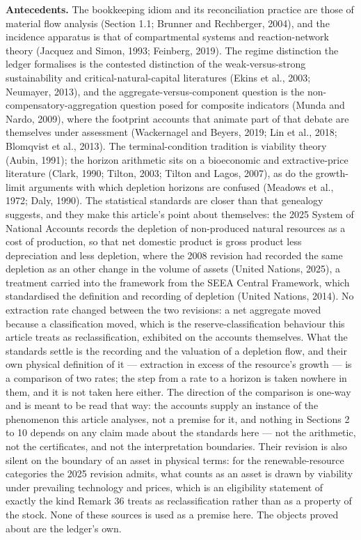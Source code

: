 \documentclass[11pt]{article}
\begin{document}
\textbf{Antecedents.} The bookkeeping idiom and its reconciliation practice are those of material flow
analysis (Section 1.1; Brunner and Rechberger, 2004), and the incidence apparatus is that of
compartmental systems and reaction-network theory (Jacquez and Simon, 1993; Feinberg, 2019). The
regime distinction the ledger formalises is the contested distinction of the weak-versus-strong
sustainability and critical-natural-capital literatures (Ekins et al., 2003; Neumayer, 2013), and
the aggregate-versus-component question is the non-compensatory-aggregation question posed for
composite indicators (Munda and Nardo, 2009), where the footprint accounts that animate part of that
debate are themselves under assessment (Wackernagel and Beyers, 2019; Lin et al., 2018; Blomqvist
et al., 2013). The terminal-condition tradition is viability theory (Aubin, 1991); the horizon
arithmetic sits on a bioeconomic and extractive-price literature (Clark, 1990; Tilton, 2003; Tilton
and Lagos, 2007), as do the growth-limit arguments with which depletion horizons are confused
(Meadows et al., 1972; Daly, 1990). The statistical standards are closer than that genealogy
suggests, and they make this article's point about themselves: the 2025 System of National Accounts
records the depletion of non-produced natural resources as a cost of production, so that net domestic
product is gross product less depreciation and less depletion, where the 2008 revision had recorded
the same depletion as an other change in the volume of assets (United Nations, 2025), a treatment
carried into the framework from the SEEA Central Framework, which standardised the definition and
recording of depletion (United Nations, 2014). No extraction rate changed between the two revisions:
a net aggregate moved because a classification moved, which is the reserve-classification behaviour
this article treats as reclassification, exhibited on the accounts themselves. What the standards
settle is the recording and the valuation of a depletion flow, and their own physical definition of it
--- extraction in excess of the resource's growth --- is a comparison of two rates; the step from a
rate to a horizon is taken nowhere in them, and it is not taken here either. The direction of the
comparison is one-way and is meant to be read that way: the accounts supply an instance of the phenomenon this
article analyses, not a premise for it, and nothing in Sections 2 to 10 depends on any claim made about the
standards here --- not the arithmetic, not the certificates, and not the interpretation boundaries. Their
revision is also silent on the boundary of an asset in physical terms: for the renewable-resource categories
the 2025 revision admits, what counts as an asset is drawn by viability under prevailing technology and
prices, which is an eligibility statement of exactly the kind Remark 36 treats as reclassification rather than
as a property of the stock. None of these sources is used as a premise here.
The objects proved about are the ledger's own.
\end{document}
